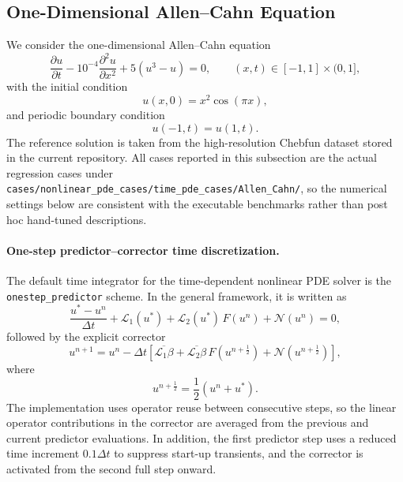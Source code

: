 \subsection{One-Dimensional Allen--Cahn Equation}
\label{subsec:ac-onestep}

We consider the one-dimensional Allen--Cahn equation
\begin{equation}
\frac{\partial u}{\partial t} - 10^{-4} \frac{\partial^2 u}{\partial x^2} + 5\left(u^3-u\right) = 0,
\qquad (x,t)\in[-1,1]\times(0,1],
\label{eq:ac-governing}
\end{equation}
with the initial condition
\begin{equation}
u(x,0)=x^2\cos(\pi x),
\label{eq:ac-initial}
\end{equation}
and periodic boundary condition
\begin{equation}
u(-1,t)=u(1,t).
\label{eq:ac-periodic}
\end{equation}
The reference solution is taken from the high-resolution Chebfun dataset stored in the current repository. All cases reported in this subsection are the actual regression cases under
\texttt{cases/nonlinear\_pde\_cases/time\_pde\_cases/Allen\_Cahn/}, so the numerical settings below are consistent with the executable benchmarks rather than post hoc hand-tuned descriptions.

\paragraph{One-step predictor--corrector time discretization.}
The default time integrator for the time-dependent nonlinear PDE solver is the \texttt{onestep\_predictor} scheme. In the general framework, it is written as
\begin{equation}
\frac{u^{*}-u^{n}}{\Delta t} + \mathcal{L}_{1}(u^{*})
 + \mathcal{L}_{2}(u^{*})\,F(u^{n}) + \mathcal{N}(u^{n}) = 0,
\label{eq:onestep-predictor}
\end{equation}
followed by the explicit corrector
\begin{equation}
u^{n+1}
=
u^{n}
- \Delta t
\left[
\overline{\mathcal{L}_{1}\beta}
+
\overline{\mathcal{L}_{2}\beta}\,F(u^{n+\frac12})
+
\mathcal{N}(u^{n+\frac12})
\right],
\label{eq:onestep-corrector}
\end{equation}
where
\begin{equation}
u^{n+\frac12}=\frac{1}{2}\left(u^{n}+u^{*}\right).
\label{eq:onestep-midpoint}
\end{equation}
The implementation uses operator reuse between consecutive steps, so the linear operator contributions in the corrector are averaged from the previous and current predictor evaluations. In addition, the first predictor step uses a reduced time increment $0.1\Delta t$ to suppress start-up transients, and the corrector is activated from the second full step onward.

